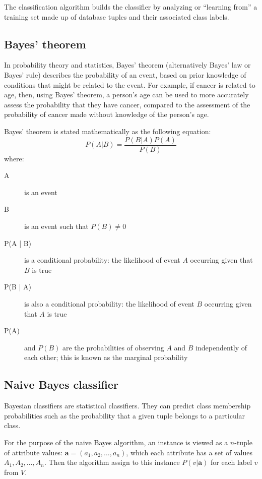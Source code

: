 \documentclass[a4paper]{article}
\renewcommand{\vec}[1]{\mathbf{#1}}
\begin{document}
		The classification algorithm builds the classifier by analyzing or
		``learning from'' a training set made up of database tuples and
		their associated class labels.

	\subsection{Bayes' theorem}

		In probability theory and statistics, Bayes' theorem (alternatively
		Bayes' law or Bayes' rule) describes the probability of an event,
		based on prior knowledge of conditions that might be related to the
		event. For example, if cancer is related to age, then, using Bayes'
		theorem, a person's age can be used to more accurately assess the
		probability that they have cancer, compared to the assessment of
		the probability of cancer made without knowledge of the person's age.

		Bayes' theorem is stated mathematically as the following equation:
		\[P(A | B) = \frac{P(B | A) P(A)}{P(B)}\]
		where:
		\begin{description}
			\item[A] is an event
			\item[B] is an event such that $P(B) \neq 0$
			\item[P(A | B)] is a conditional probability: the likelihood
			of event $A$ occurring given that $B$ is true
			\item[P(B | A)] is also a conditional probability: the
			likelihood of event $B$ occurring given that $A$ is true
			\item[P(A)] and $P(B)$ are the probabilities of observing $A$ and $B$
				independently of each other; this is known as the marginal probability
		\end{description}
		
	\subsection{Naive Bayes classifier}
		Bayesian classifiers are statistical classifiers. They can predict
		class membership probabilities such as the probability that a
		given tuple belongs to a particular class.

		For the purpose of the naive Bayes algorithm, an instance is viewed
		as a $n$-tuple of attribute values: $\vec{a} = (a_1, a_2, \ldots,
		a_n)$, which each attribute has a set of values $A_1, A_2, \ldots,
		A_n$. Then the algorithm assign to this instance $P(v | \vec{a})$
		for each label $v$ from $V$.
\end{document}
